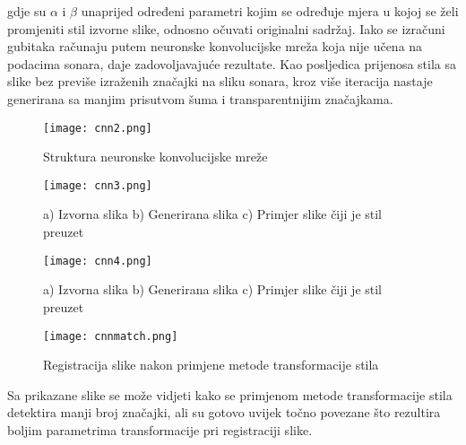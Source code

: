 \documentclass[times, utf8, diplomski]{fer}
\begin{document}
gdje su $\alpha$ i $\beta$ unaprijed određeni parametri kojim se određuje mjera u kojoj se želi promjeniti stil izvorne slike, odnosno očuvati originalni sadržaj. Iako se izračuni gubitaka računaju putem neuronske konvolucijske mreža koja nije učena na podacima sonara, daje zadovoljavajuće rezultate. Kao posljedica prijenosa stila sa slike bez previše izraženih značajki na sliku sonara, kroz više iteracija nastaje generirana sa manjim prisutvom šuma i transparentnijim značajkama. 

\begin{figure}[tbh]
\centering
\texttt{[image: cnn2.png]}
		\caption{Struktura neuronske konvolucijske mreže }
		\label{fig:Uspješna registracija dviju akustičnih slika FLS-a}
\end{figure}
\newpage
\begin{figure}[tbh]
\centering
\texttt{[image: cnn3.png]}
		\caption{a) Izvorna slika b) Generirana slika c) Primjer slike čiji je stil preuzet}
		\label{fig:cnn1-style transfer method}
\end{figure}
\begin{figure}[tbh]
\centering
\texttt{[image: cnn4.png]}
		\caption{a) Izvorna slika b) Generirana slika c) Primjer slike čiji je stil preuzet}
		\label{fig:cnn2-style transfer method}
\end{figure}
\begin{figure}[!tbh]
\centering
\texttt{[image: cnnmatch.png]}
		\caption{ Registracija slike nakon primjene metode transformacije stila}
		\label{fig:Uspješna registracija dviju akustičnih slika FLS-a}
\end{figure}
Sa prikazane slike se može vidjeti kako se primjenom metode transformacije stila detektira manji broj značajki, ali su gotovo uvijek točno povezane što rezultira boljim parametrima transformacije pri registraciji slike.
\end{document}
